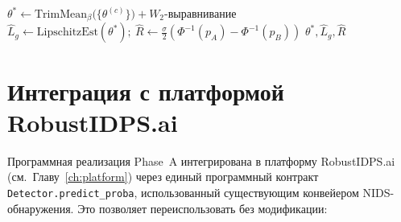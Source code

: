 \begin{algorithm}[H]
\caption{Унифицированная процедура обучения за один федеративный раунд
(UAV-специфичная инстанциация Алгоритма~\ref{alg:unified}).}
\label{alg:uav_unified_round}
$\theta^{*}\leftarrow \mathrm{TrimMean}_{\beta}\bigl(\{\theta^{(c)}\}\bigr)
  + W_2\text{-выравнивание}$
$\hat L_g \leftarrow \mathrm{LipschitzEst}(\theta^{*});\
  \hat R \leftarrow \tfrac{\sigma}{2}(\Phi^{-1}(p_A)-\Phi^{-1}(p_B))$\;
\Return $\theta^{*},\hat L_g,\hat R$\;
\end{algorithm}


\section{Интеграция с платформой \textsf{RobustIDPS.ai}}
\label{sec:uav_robustidps_integration}

Программная реализация Phase~A интегрирована в платформу
\textsf{RobustIDPS.ai} (см.~Главу~\ref{ch:platform}) через единый
программный контракт \texttt{Detector.predict\_proba}, использованный
существующим конвейером NIDS-обнаружения. Это позволяет переиспользовать
без модификации:

